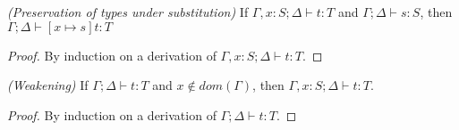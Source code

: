 \begin{lemma}
\emph{(Preservation of types under substitution)}
\label{lem:substitution}
If $\Gamma, x : S ; \Delta \vdash t : T$ and $\Gamma ; \Delta \vdash s : S$, then $\Gamma ; \Delta \vdash [x \mapsto s]t : T$
\end{lemma}
\begin{proof}
By induction on a derivation of $\Gamma, x : S ; \Delta \vdash t : T$.
\end{proof}


\begin{lemma}
\emph{(Weakening)}
\label{lem:weak}
If $\Gamma ; \Delta \vdash t : T$ and $x \notin dom(\Gamma)$, then $\Gamma, x : S ; \Delta \vdash t : T$.
\end{lemma}
\begin{proof}
By induction on a derivation of $\Gamma ; \Delta \vdash t : T$.
\end{proof}


